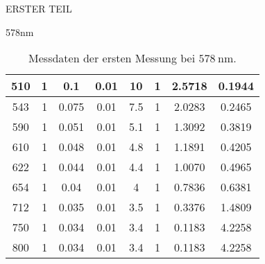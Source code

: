 \begin{appendix}
\begin{chapter}{ERSTER TEIL}
\begin{section}{578nm}
\begin{table}[htbp]
\begin{tabular}{|c|c|c|c|c|c|c|c|}
            510 & 1 & 0.1 & 0.01 & 10 & 1 & 2.5718 & 0.1944 \\ \hline
            543 & 1 & 0.075 & 0.01 & 7.5 & 1 & 2.0283 & 0.2465 \\ \hline
            590 & 1 & 0.051 & 0.01 & 5.1 & 1 & 1.3092 & 0.3819 \\ \hline
            610 & 1 & 0.048 & 0.01 & 4.8 & 1 & 1.1891 & 0.4205 \\ \hline
            622 & 1 & 0.044 & 0.01 & 4.4 & 1 & 1.0070 & 0.4965 \\ \hline
            654 & 1 & 0.04 & 0.01 & 4 & 1 & 0.7836 & 0.6381 \\ \hline
            712 & 1 & 0.035 & 0.01 & 3.5 & 1 & 0.3376 & 1.4809 \\ \hline
            750 & 1 & 0.034 & 0.01 & 3.4 & 1 & 0.1183 & 4.2258 \\ \hline
            800 & 1 & 0.034 & 0.01 & 3.4 & 1 & 0.1183 & 4.2258 \\ \hline
          \end{tabular}
          \caption{Messdaten der ersten Messung bei $\SI{578}{\nano\meter}$.}
          \label{tab:578_1}
        \end{table}
        

\end{section}
\end{chapter}
\end{appendix}

